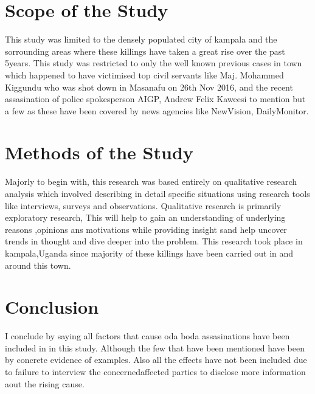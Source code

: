 \documentclass{article}
\begin{document}
\section{Scope of the Study}
This study was limited to the densely populated city of kampala and the sorrounding areas
where these killings have taken a great rise over the past 5years. This study was restricted
to only the well known previous cases in town which happened to have victimised top civil
servants like Maj. Mohammed Kiggundu who was shot down in Masanafu on 26th Nov 2016,
and the recent assasination of police spokesperson AIGP, Andrew Felix Kaweesi to mention
but a few as these have been covered by news agencies like NewVision, DailyMonitor.


\section {Methods of the Study}
Majorly to begin with, this research was based entirely on qualitative research analysis
which involved describing in detail specific situations using research tools like interviews,
surveys and observations. Qualitative research is primarily exploratory research, This 
will help to gain an understanding of underlying reasons ,opinions ans motivations while
providing insight sand help uncover trends in thought and dive deeper into the problem.
This research took place in kampala,Uganda since majority of these killings have been 
carried out in and around this town.


\section{Conclusion}
I conclude by saying all factors that cause oda boda assasinations have been included in
in this study. Although the few that have been mentioned have been by concrete evidence 
of examples.
Also all the effects have not been included due to failure to interview the concernedaffected 
parties to disclose more information aout the rising cause. 
\end{document}
